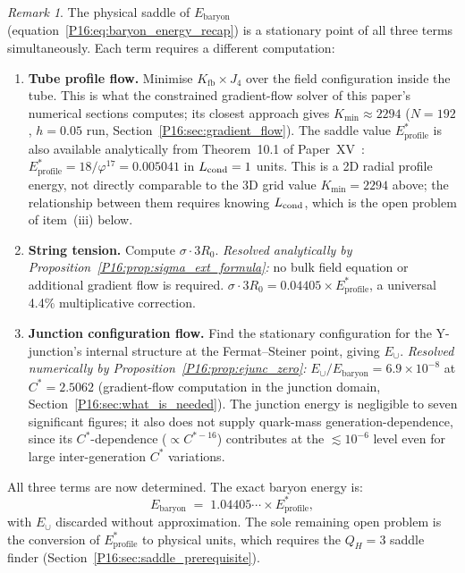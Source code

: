 \documentclass[11pt,a4paper]{article}
\theoremstyle{definition}\newtheorem{definition}[theorem]{Definition}
\theoremstyle{remark}
\newtheorem{remark}[theorem]{Remark}
\theoremstyle{definition}\newtheorem{construction}[theorem]{Construction}
\newcommand{\vp}{\varphi}
\newcommand{\Kfb}{K_{\mathrm{fb}}}
\newcommand{\QH}{Q_H}
\begin{document}
\begin{remark}
\label{P16:rem:three_flows}
The physical saddle of $E_{\mathrm{baryon}}$
(equation~\eqref{P16:eq:baryon_energy_recap}) is a stationary point of all
three terms simultaneously.  Each term requires a different computation:
\begin{enumerate}[label=(\roman*)]
\item \textbf{Tube profile flow.} Minimise $\Kfb\times J_4$ over the
  field configuration inside the tube.  This is what the constrained
  gradient-flow solver of this paper's numerical sections computes; its
  closest approach gives $K_{\min}\approx2294$ ($N=192$, $h=0.05$ run,
  Section~\ref{P16:sec:gradient_flow}).  The saddle value $E_{\mathrm{profile}}^*$
  is also available analytically from Theorem~10.1 of Paper~XV~\cite{Paper15}: $E_{\mathrm{profile}}^* = 18/\vp^{17}
  = 0.005041$ in $L_{\rm cond}=1$ units.  This is a 2D radial profile
  energy, not directly comparable to the 3D grid value $K_{\min}=2294$
  above; the relationship between them requires knowing $L_{\rm cond}$,
  which is the open problem of item~(iii) below.
\item \textbf{String tension.} Compute $\sigma\cdot3R_0$.
  \emph{Resolved analytically by Proposition~\ref{P16:prop:sigma_ext_formula}:}
  no bulk field equation or additional gradient flow is required.
  $\sigma\cdot3R_0 = 0.04405\times E_{\mathrm{profile}}^*$,
  a universal 4.4\% multiplicative correction.
\item \textbf{Junction configuration flow.} Find the stationary
  configuration for the Y-junction's internal structure at the
  Fermat--Steiner point, giving $E_\cup$.
  \emph{Resolved numerically by Proposition~\ref{P16:prop:ejunc_zero}:}
  $E_\cup/E_{\mathrm{baryon}} = 6.9\times10^{-8}$ at $C^*=2.5062$
  (gradient-flow computation in the junction domain, Section~\ref{P16:sec:what_is_needed}).
  The junction energy is negligible to seven significant figures;
  it also does not supply quark-mass generation-dependence, since
  its $C^*$-dependence ($\propto C^{*-16}$) contributes at the
  $\lesssim10^{-6}$ level even for large inter-generation $C^*$ variations.
\end{enumerate}
All three terms are now determined.  The exact baryon energy is:
\begin{equation}
  \boxed{E_{\mathrm{baryon}}
  \;=\; 1.04405\cdots\times E_{\mathrm{profile}}^*,}
  \label{P16:eq:Ebaryon_exact}
\end{equation}
with $E_\cup$ discarded without approximation.  The sole remaining
open problem is the conversion of $E_{\mathrm{profile}}^*$ to physical
units, which requires the $\QH=3$ saddle finder
(Section~\ref{P16:sec:saddle_prerequisite}).
\end{remark}
\end{document}
